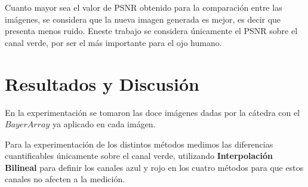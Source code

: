 \documentclass[a4paper]{article}
\begin{document}
Cuanto mayor sea el valor de PSNR obtenido para la comparación entre las imágenes, se considera que la nueva imagen generada es mejor, es decir que presenta menos ruido. Eneste trabajo se considera únicamente el PSNR sobre el canal verde, por ser el más importante para el ojo humano.

\newpage
\section{Resultados y Discusi\'{o}n}
\label{sec:res}





En la experimentación se tomaron las doce imágenes dadas por la cátedra con el $Bayer Array$ ya aplicado en cada imágen.

Para la experimentación de los distintos métodos medimos las diferencias cuantificables únicamente sobre el canal verde, utilizando \textbf{Interpolación Bilineal} para definir los canales azul y rojo en los cuatro métodos para que estos canales no afecten a la medición.
\end{document}
